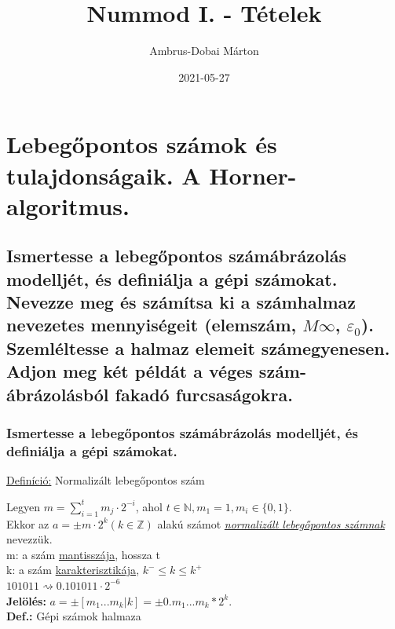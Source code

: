 \documentclass{article}
\title{Nummod I. - Tételek}
\date{2021-05-27}
\author{Ambrus-Dobai Márton}
\begin{document}
    \maketitle

    \tableofcontents

    \section{Lebegőpontos számok és tulajdonságaik. A Horner-algoritmus.}
        \subsection{
        Ismertesse a lebegőpontos számábrázolás modelljét, és definiálja a gépi számokat.
        Nevezze meg és számítsa ki a számhalmaz nevezetes mennyiségeit (elemszám, $M\infty$, $\varepsilon_0$).
        Szemléltesse a halmaz elemeit számegyenesen. Adjon meg két példát a véges szám-ábrázolásból fakadó furcsaságokra.
        }

            \subsubsection{Ismertesse a lebegőpontos számábrázolás modelljét, és definiálja a gépi számokat.}

            \underline{Definíció:} Normalizált lebegőpontos szám

            Legyen $m = \sum^{t}_{i=1} m_j\cdot2^{-i}$, ahol $ t \in \mathbb{N}, m_1 = 1, m_i \in \{0,1\}$. ~\\
            Ekkor az $a = \pm m \cdot 2^k (k \in \mathbb{Z})$ alakú számot \underline{\textit{normalizált lebegőpontos számnak}} nevezzük. ~\\
            m: a szám \underline{mantisszája}, hossza t ~\\
            k: a szám \underline{karakterisztikája}, $k^- \leq k \leq k^+$ ~\\

            $101011 \rightsquigarrow 0.101011\cdot2^{-6}$ ~\\
            \textbf{Jelölés:} $a = \pm[m_1...m_k|k] = \pm0.m_1...m_k * 2^k$. ~\\
            \textbf{Def.:} Gépi számok halmaza ~\\
\end{document}
